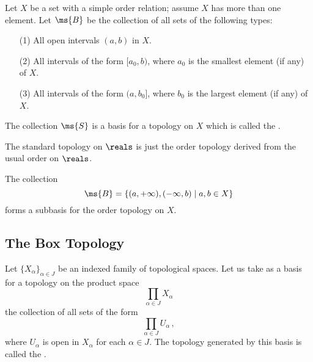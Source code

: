 \begin{definition}
	Let $X$ be a set with a simple order relation; assume $X$ has 
	more than one element. Let $\ms{B}$ be the collection of all 
	sets of the following types: 
	\begin{enumerate}
		\item[(1)] All open intervals $(a,b)$ in $X$.
		
		\item[(2)] All intervals of the form $[a_0,b)$, where 
		$a_0$ is the smallest element (if any) of $X$.
		
		\item[(3)] All intervals of the form $(a,b_0]$, where 
		$b_0$ is the largest element (if any) of $X$.
	\end{enumerate}
	The collection $\ms{S}$ is a basis for a topology on $X$ 
	which is called the .
\end{definition}

\begin{example}
	The standard topology on $\reals$ is just the order topology 
	derived from the usual order on $\reals$.
\end{example}

The collection
\[
	\ms{B} = \{ (a,+\infty), (-\infty,b) \mid a,b \in X \}
\]
forms a subbasis for the order topology on $X$.


\newpage

\subsection{The Box Topology}

\begin{definition}
	Let $\{ X_\alpha \}_{\alpha \in J}$ be an indexed family of 
	topological spaces. Let us take as a basis for a topology on 
	the product space
	\[
		\prod_{\alpha \in J} X_\alpha
	\]
	the collection of all sets of the form
	\[
		\prod_{\alpha \in J} U_\alpha\,,
	\]
	where $U_\alpha$ is open in $X_\alpha$ for each $\alpha \in J$. 
	The topology generated by this basis is called the .
\end{definition}

